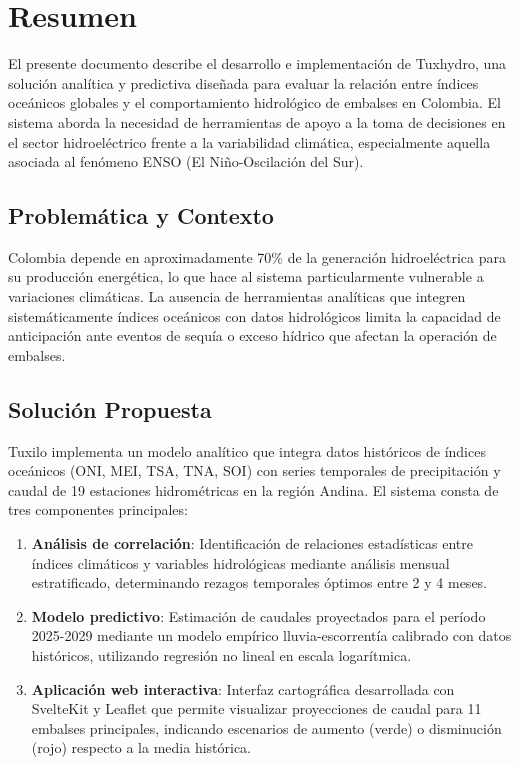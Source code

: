 \chapter{Resumen}

El presente documento describe el desarrollo e implementación de Tuxhydro, una solución analítica y predictiva diseñada para evaluar la relación entre índices oceánicos globales y el comportamiento hidrológico de embalses en Colombia. El sistema aborda la necesidad de herramientas de apoyo a la toma de decisiones en el sector hidroeléctrico frente a la variabilidad climática, especialmente aquella asociada al fenómeno ENSO (El Niño-Oscilación del Sur).

\section*{Problemática y Contexto}

Colombia depende en aproximadamente 70\% de la generación hidroeléctrica para su producción energética, lo que hace al sistema particularmente vulnerable a variaciones climáticas. La ausencia de herramientas analíticas que integren sistemáticamente índices oceánicos con datos hidrológicos limita la capacidad de anticipación ante eventos de sequía o exceso hídrico que afectan la operación de embalses.

\section*{Solución Propuesta}

Tuxilo\cite{tuxilo-github} implementa un modelo analítico que integra datos históricos de índices oceánicos (ONI, MEI, TSA, TNA, SOI) con series temporales de precipitación y caudal de 19 estaciones hidrométricas en la región Andina. El sistema consta de tres componentes principales:

\begin{enumerate}
    \item \textbf{Análisis de correlación}: Identificación de relaciones estadísticas entre índices climáticos y variables hidrológicas mediante análisis mensual estratificado, determinando rezagos temporales óptimos entre 2 y 4 meses.
    
    \item \textbf{Modelo predictivo}: Estimación de caudales proyectados para el período 2025-2029 mediante un modelo empírico lluvia-escorrentía calibrado con datos históricos, utilizando regresión no lineal en escala logarítmica.
    
    \item \textbf{Aplicación web interactiva}: Interfaz cartográfica desarrollada con SvelteKit y Leaflet que permite visualizar proyecciones de caudal para 11 embalses principales, indicando escenarios de aumento (verde) o disminución (rojo) respecto a la media histórica.
\end{enumerate}

